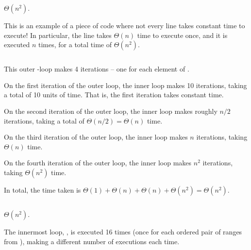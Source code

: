 \begin{prob}
\begin{subprobset}
        \begin{subprob}
            \inputminted{python}{\thisdir/include/part_d.py}

            \begin{soln}
                $\Theta(n^2)$.

                This is an example of a piece of code where not every line
                takes constant time to execute! In particular, the  line
                takes $\Theta(n)$ time to execute once, and it is executed $n$ times, for
                a total time of $\Theta(n^2)$.
            \end{soln}
        \end{subprob}

        \begin{subprob}
            \inputminted{python}{\thisdir/include/part_e.py}

            \begin{soln}
                This outer -loop makes 4 iterations -- one for each
                element of .

                On the first iteration of the outer loop, the inner loop makes
                10 iterations, taking a total of 10 units of time. That is, the
                first iteration takes constant time.

                On the second iteration of the outer loop, the inner loop makes
                roughly $n/2$ iterations, taking a total of $\Theta(n/2) =
                \Theta(n)$ time.

                On the third iteration of the outer loop, the inner loop makes
                $n$ iterations, taking $\Theta(n)$ time.

                On the fourth iteration of the outer loop, the inner loop makes
                $n^2$ iterations, taking $\Theta(n^2)$ time.

                In total, the time taken is $\Theta(1) + \Theta(n) + \Theta(n) + \Theta(n^2) = \Theta(n^2)$.
            \end{soln}
        \end{subprob}

        \begin{subprob}
            \inputminted{python}{\thisdir/include/part_f.py}

            \begin{soln}
                $\Theta(n^2)$.

                The innermost loop, , is executed 
                16 times (once for each ordered pair of ranges from ), making
                a different number of executions each time.


\end{soln}
\end{subprob}
\end{subprobset}
\end{prob}
